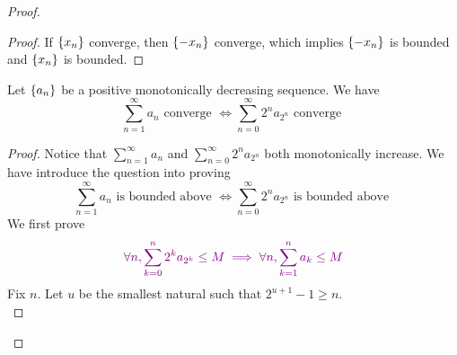 \documentclass{report}
\begin{document}
\begin{proof}
\begin{proof}
If $\{ x_n \}$ converge, then $\{ -x_n \}$ converge, which implies $\{ -x_n \}$ is bounded and $\{ x_n \}$ is bounded.
\end{proof}
\begin{lemma}
\label{4.2.11}
Let $\{ a_n \}$ be a positive monotonically decreasing sequence. We have
 \begin{equation}
\sum_{n=1}^\infty a_n\text{ converge }\iff \sum_{n=0}^\infty 2^na_{2^n}\text{ converge }
\end{equation}
\end{lemma}
\begin{proof}
Notice that $\sum_{n=1}^\infty a_n$ and $\sum_{n=0}^\infty 2^n a_{2^n}$ both monotonically increase. We have introduce the question into proving 
\begin{equation}
\sum_{n=1}^\infty a_n\text{ is bounded above }\iff \sum_{n=0}^\infty 2^na_{2^n}\text{ is bounded above }
\end{equation}
We first prove
\begin{equation}
\textcolor{violet}{\forall n,\sum_{k=0}^n 2^ka_{2^k}\leq M\implies \forall n,\sum_{k=1}^n a_k\leq M}
\end{equation}
Fix $n$. Let  $u$ be the smallest natural such that  $2^{u+1}-1\geq n$.\\


\end{proof}
\end{proof}
\end{document}
